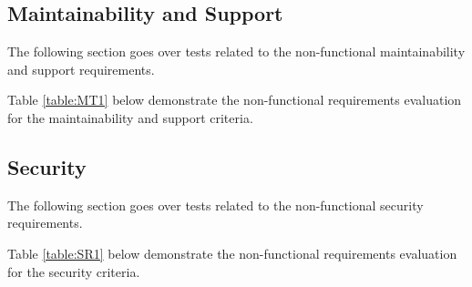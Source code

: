\documentclass[12pt, titlepage]{article}
\begin{document}
\subsection{Maintainability and Support}

The following section goes over tests related to the non-functional maintainability and support requirements.


Table \ref{table:MT1} below demonstrate the non-functional requirements evaluation for the maintainability and support criteria.

\begin{table}[H]
\caption{\bf Non-Functional Requirements Evaluation Results for Maintainability and Support Testing}
\label{table:MT1}
\end{table}

\subsection{Security}

The following section goes over tests related to the non-functional security requirements.


Table \ref{table:SR1} below demonstrate the non-functional requirements evaluation for the security criteria.
\end{document}
